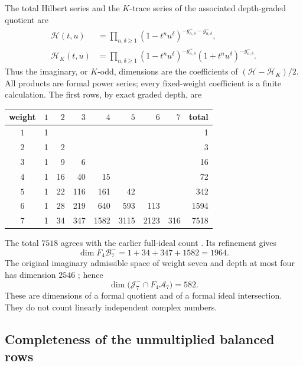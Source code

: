 \documentclass[11pt,a4paper]{article}
\numberwithin{equation}{section}
\theoremstyle{definition}
\theoremstyle{remark}
\begin{document}
The total Hilbert series and the $K$-trace series of the associated
depth-graded quotient are
\begin{align}
 \mathscr H(t,u)&=\prod_{n,\delta\ge1}
 (1-t^nu^\delta)^{-g^+_{n,\delta}-g^-_{n,\delta}},
 \label{depthcay:eq:Hilbert}\\
 \mathscr H_K(t,u)&=\prod_{n,\delta\ge1}
 (1-t^nu^\delta)^{-g^+_{n,\delta}}
 (1+t^nu^\delta)^{-g^-_{n,\delta}}.
 \label{depthcay:eq:HilbertK}
\end{align}
Thus the imaginary, or $K$-odd, dimensions are the coefficients of
$(\mathscr H-\mathscr H_K)/2$. All products are formal power series;
every fixed-weight coefficient is a finite calculation.
The first rows, by exact graded depth, are
\begin{center}
\begin{tabular}{c|rrrrrrr|r}
\toprule
weight & $1$ & $2$ & $3$ & $4$ & $5$ & $6$ & $7$ & total\\
\midrule
$1$ &1&&&&&&&1\\
$2$ &1&2&&&&&&3\\
$3$ &1&9&6&&&&&16\\
$4$ &1&16&40&15&&&&72\\
$5$ &1&22&116&161&42&&&342\\
$6$ &1&28&219&640&593&113&&1594\\
$7$ &1&34&347&1582&3115&2123&316&7518\\
\bottomrule
\end{tabular}
\end{center}
The total $7518$ agrees with the earlier full-ideal count
\cite{depth:PriorProjection}. Its refinement gives
\begin{equation}\label{depthcay:eq:weightseven}
 \dim F_4\mathcal B_7^-=1+34+347+1582=1964.
\end{equation}
The original imaginary admissible space of weight seven and depth at
most four has dimension $2546$ \cite{depth:PriorS6}; hence
\begin{equation}\label{depthcay:eq:intersection}
 \dim\bigl(\mathcal J_7^-\cap F_4\mathcal A_7\bigr)=582.
\end{equation}
These are dimensions of a formal quotient and of a formal ideal
intersection. They do not count linearly independent complex numbers.

\subsection{Completeness of the unmultiplied balanced rows}
\end{document}
